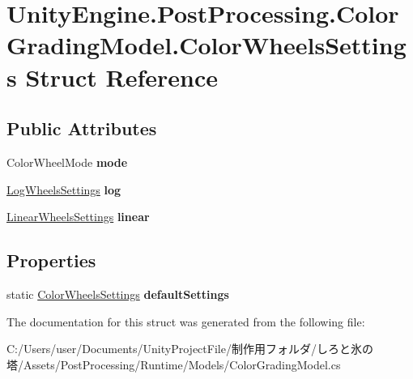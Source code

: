 \hypertarget{struct_unity_engine_1_1_post_processing_1_1_color_grading_model_1_1_color_wheels_settings}{}\section{Unity\+Engine.\+Post\+Processing.\+Color\+Grading\+Model.\+Color\+Wheels\+Settings Struct Reference}
\label{struct_unity_engine_1_1_post_processing_1_1_color_grading_model_1_1_color_wheels_settings}
\subsection*{Public Attributes}
\begin{DoxyCompactItemize}
\item 
\mbox{\label{struct_unity_engine_1_1_post_processing_1_1_color_grading_model_1_1_color_wheels_settings_a1585463b103bd02972e8d8f1a22e3bf1}} 
Color\+Wheel\+Mode {\bfseries mode}
\item 
\mbox{\label{struct_unity_engine_1_1_post_processing_1_1_color_grading_model_1_1_color_wheels_settings_a4e850e98ea6605f15205c1c570c70ef8}} 
\hyperlink{struct_unity_engine_1_1_post_processing_1_1_color_grading_model_1_1_log_wheels_settings}{Log\+Wheels\+Settings} {\bfseries log}
\item 
\mbox{\label{struct_unity_engine_1_1_post_processing_1_1_color_grading_model_1_1_color_wheels_settings_a854d17dcc8e666c1b2d83c929f51d60e}} 
\hyperlink{struct_unity_engine_1_1_post_processing_1_1_color_grading_model_1_1_linear_wheels_settings}{Linear\+Wheels\+Settings} {\bfseries linear}
\end{DoxyCompactItemize}
\subsection*{Properties}
\begin{DoxyCompactItemize}
\item 
\mbox{\label{struct_unity_engine_1_1_post_processing_1_1_color_grading_model_1_1_color_wheels_settings_a33abb6c6ab3bff855b18c53f85bf392b}} 
static \hyperlink{struct_unity_engine_1_1_post_processing_1_1_color_grading_model_1_1_color_wheels_settings}{Color\+Wheels\+Settings} {\bfseries default\+Settings}
\end{DoxyCompactItemize}


The documentation for this struct was generated from the following file\+:\begin{DoxyCompactItemize}
\item 
C\+:/\+Users/user/\+Documents/\+Unity\+Project\+File/制作用フォルダ/しろと氷の塔/\+Assets/\+Post\+Processing/\+Runtime/\+Models/Color\+Grading\+Model.\+cs\end{DoxyCompactItemize}
